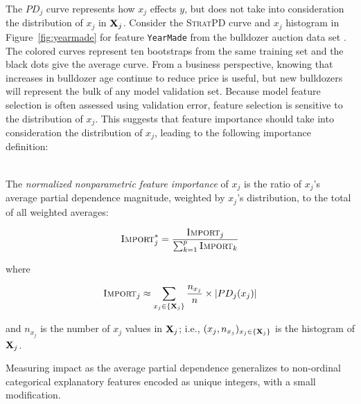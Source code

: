 \documentclass[smallextended]{svjour3}       %
\newcommand{\figref}[1]{Figure~\ref{#1}}
\DeclareMathOperator{\Ex}{\mathbb{E}}
\newcommand{\Impo}{\fontfamily{cmr}\textsc{Import}}
\newcommand{\spd}{\fontfamily{cmr}\textsc{\small StratPD}}
\begin{document}
The $PD_j$ curve represents how $x_j$ effects $y$, but does not take into consideration the distribution of $x_j$ in ${\bf X}_j$.  Consider the \spd{} curve and $x_j$ histogram in \figref{fig:yearmade} for feature {\tt\small YearMade} from the bulldozer auction data set \citep{bulldozer}. The colored curves represent ten bootstraps from the same training set and the black dots give the average curve.   From a business perspective, knowing that increases in bulldozer age continue to reduce price is useful, but new bulldozers will represent the bulk of any model validation set.  Because model feature selection is often assessed using  validation error, feature selection is sensitive to the distribution of $x_j$. This suggests that feature importance should take into consideration the distribution of $x_j$, leading to the following importance definition:

~\\
 The {\em normalized nonparametric feature importance} of $x_j$ is the ratio of $x_j$'s average partial dependence magnitude, weighted by $x_j$'s distribution, to the total of all weighted averages:


\begin{equation}\label{eq:Epd3b}
\Impo_j^{*} = \frac{\Impo_j}{\sum_{k=1}^p \Impo_k}
\end{equation}

\noindent where

\begin{equation}\label{eq:Epd3c}
\Impo_j \approx \sum_{x_j \in \{{\bf X}_j\}} \frac{n_{x_j}}{n} \times |PD_j(x_j)|
\end{equation}

\noindent and $n_{x_j}$ is the number of $x_j$ values in ${\bf X}_j$; i.e., $(x_j, n_{x_j})_{x_j \in \{{\bf X}_j\}}$ is the histogram of ${\bf X}_j$.


Measuring impact as the average partial dependence generalizes to non-ordinal categorical explanatory features encoded as unique integers, with a small modification.  
\end{document}
